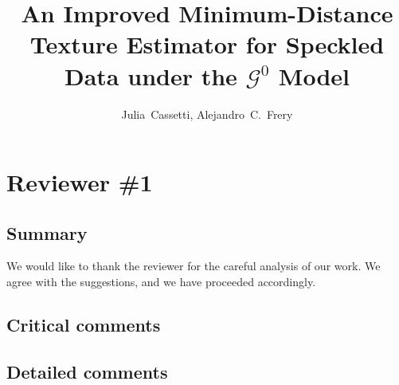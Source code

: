 \documentclass{ar2rc}
\title{An Improved Minimum-Distance Texture Estimator for Speckled Data under the $\mathcal{G}^0$ Model}
\author{Julia~Cassetti,
	Alejandro~C.~Frery}
\begin{document}
	
	\maketitle
	
	\section{Reviewer \#1}
	
	\subsection{Summary}
	

\AR We would like to thank the reviewer for the careful analysis of our work.
We agree with the suggestions, and we have proceeded accordingly.
	
	\subsection{Critical comments}

	
\subsection{Detailed comments}

\end{document}
